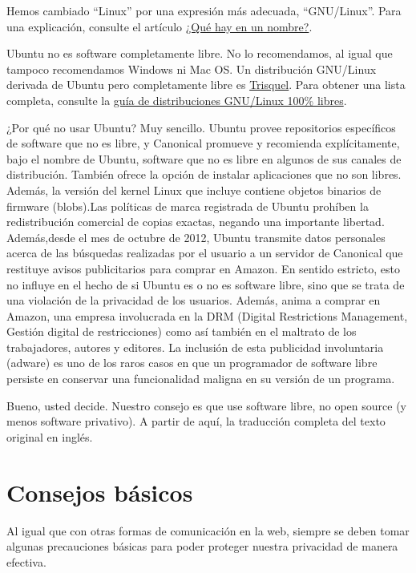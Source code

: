 \documentclass[10pt,a5paper,twoside,,]{book}
\begin{document}
Hemos cambiado ``Linux'' por una expresión más adecuada, ``GNU/Linux''.
Para una explicación, consulte el artículo
\href{https://www.gnu.org/gnu/why-gnu-linux.es.html}{¿Qué hay en un
nombre?}.

Ubuntu no es software completamente libre. No lo recomendamos, al igual
que tampoco recomendamos Windows ni Mac OS. Un distribución GNU/Linux
derivada de Ubuntu pero completamente libre es
\href{https://trisquel.info/es}{Trisquel}. Para obtener una lista
completa, consulte la
\href{https://www.gnu.org/distros/free-distros.es.html}{guía de
distribuciones GNU/Linux 100\% libres}.

¿Por qué no usar Ubuntu? Muy sencillo. Ubuntu provee repositorios
específicos de software que no es libre, y Canonical promueve y
recomienda explícitamente, bajo el nombre de Ubuntu, software que no es
libre en algunos de sus canales de distribución. También ofrece la
opción de instalar aplicaciones que no son libres. Además, la versión
del kernel Linux que incluye contiene objetos binarios de firmware
(blobs).Las políticas de marca registrada de Ubuntu prohíben la
redistribución comercial de copias exactas, negando una importante
libertad. Además,desde el mes de octubre de 2012, Ubuntu transmite datos
personales acerca de las búsquedas realizadas por el usuario a un
servidor de Canonical que restituye avisos publicitarios para comprar en
Amazon. En sentido estricto, esto no influye en el hecho de si Ubuntu es
o no es software libre, sino que se trata de una violación de la
privacidad de los usuarios. Además, anima a comprar en Amazon, una
empresa involucrada en la DRM (Digital Restrictions Management, Gestión
digital de restricciones) como así también en el maltrato de los
trabajadores, autores y editores. La inclusión de esta publicidad
involuntaria (adware) es uno de los raros casos en que un programador de
software libre persiste en conservar una funcionalidad maligna en su
versión de un programa.

Bueno, usted decide. Nuestro consejo es que use software libre, no open
source (y menos software privativo). A partir de aquí, la traducción
completa del texto original en inglés.

\chapter{Consejos básicos}\label{consejos-buxe1sicos}

Al igual que con otras formas de comunicación en la web, siempre se
deben tomar algunas precauciones básicas para poder proteger nuestra
privacidad de manera efectiva.
\end{document}
